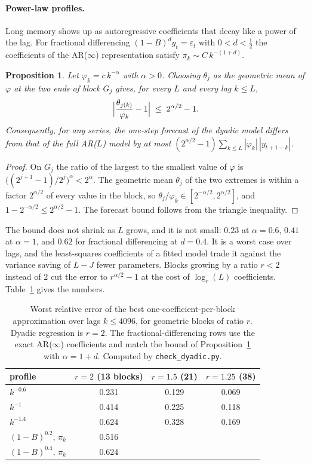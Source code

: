 \documentclass[11pt]{article}
\newtheorem{proposition}{Proposition}
\begin{document}
\paragraph{Power-law profiles.} Long memory shows up as autoregressive coefficients that decay like a
power of the lag. For fractional differencing $(1-B)^d y_t=\varepsilon_t$ with $0<d<\tfrac12$ the
coefficients of the AR($\infty$) representation satisfy $\pi_k\sim C\,k^{-(1+d)}$.

\begin{proposition}\label{prop:powerlaw}
Let $\varphi_k=c\,k^{-\alpha}$ with $\alpha>0$. Choosing $\theta_j$ as the geometric mean of
$\varphi$ at the two ends of block $G_j$ gives, for every $L$ and every lag $k\le L$,
\[
\Bigl|\frac{\theta_{j(k)}}{\varphi_k}-1\Bigr|\;\le\;2^{\alpha/2}-1 .
\]
Consequently, for any series, the one-step forecast of the dyadic model differs from that of the
full AR($L$) model by at most $(2^{\alpha/2}-1)\sum_{k\le L}|\varphi_k|\,|y_{t+1-k}|$.
\end{proposition}

\begin{proof}
On $G_j$ the ratio of the largest to the smallest value of $\varphi$ is
$\bigl((2^{j+1}-1)/2^j\bigr)^{\alpha}<2^{\alpha}$. The geometric mean $\theta_j$ of the two extremes
is within a factor $2^{\alpha/2}$ of every value in the block, so
$\theta_j/\varphi_k\in[2^{-\alpha/2},2^{\alpha/2}]$, and $1-2^{-\alpha/2}\le 2^{\alpha/2}-1$. The
forecast bound follows from the triangle inequality.
\end{proof}

The bound does not shrink as $L$ grows, and it is not small: $0.23$ at $\alpha=0.6$, $0.41$ at
$\alpha=1$, and $0.62$ for fractional differencing at $d=0.4$. It is a worst case over lags, and the
least-squares coefficients of a fitted model trade it against the variance saving of $L-J$ fewer
parameters. Blocks growing by a ratio $r<2$ instead of $2$ cut the error to $r^{\alpha/2}-1$ at the
cost of $\log_r(L)$ coefficients. Table~\ref{tab:powerlaw} gives the numbers.

\begin{table}[h]
\centering
\begin{tabular}{lccc}
\toprule
profile & $r=2$ (13 blocks) & $r=1.5$ (21) & $r=1.25$ (38)\\
\midrule
$k^{-0.6}$ & 0.231 & 0.129 & 0.069\\
$k^{-1}$ & 0.414 & 0.225 & 0.118\\
$k^{-1.4}$ & 0.624 & 0.328 & 0.169\\
$(1-B)^{0.2}$, $\pi_k$ & 0.516 & & \\
$(1-B)^{0.4}$, $\pi_k$ & 0.624 & & \\
\bottomrule
\end{tabular}
\caption{Worst relative error of the best one-coefficient-per-block approximation over lags
$k\le 4096$, for geometric blocks of ratio $r$. Dyadic regression is $r=2$. The fractional-differencing
rows use the exact AR($\infty$) coefficients and match the bound of
Proposition~\ref{prop:powerlaw} with $\alpha=1+d$. Computed by \texttt{check\_dyadic.py}.}
\label{tab:powerlaw}
\end{table}
\end{document}

